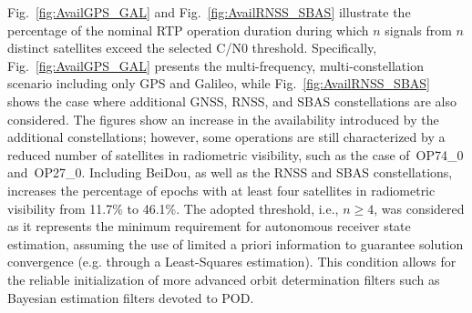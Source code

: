 \documentclass{IEEEtaes}
\begin{document}
Fig.~\ref{fig:AvailGPS_GAL} and Fig.~\ref{fig:AvailRNSS_SBAS} illustrate the percentage of the nominal RTP operation duration during which 
$n$ signals from $n$ distinct satellites exceed the selected \gls{C/N0} threshold. Specifically, Fig.~\ref{fig:AvailGPS_GAL} presents the multi-frequency, multi-constellation scenario including only \gls{GPS} and Galileo, while Fig.~\ref{fig:AvailRNSS_SBAS} shows the case where additional GNSS, \gls{RNSS}, and \gls{SBAS} constellations are also considered. The figures show an increase in the availability introduced by the additional constellations; however, some operations are still characterized by a reduced number of satellites in radiometric visibility, such as the case of~OP74\_0 and~OP27\_0. 
Including BeiDou, as well as the \gls{RNSS} and \gls{SBAS} constellations, increases the percentage of epochs with at least four satellites in radiometric visibility from 11.7\% to 46.1\%. The adopted threshold, i.e., $n\geq4$, was considered as it represents the minimum requirement for autonomous receiver state estimation, assuming the use of limited a priori information to guarantee solution convergence (e.g. through a Least-Squares estimation). This condition allows for the reliable initialization of more advanced orbit determination filters such as Bayesian estimation filters devoted to \gls{POD}. 
\end{document}
